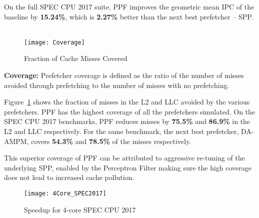 On the full SPEC CPU 2017 suite, PPF improves the geometric mean IPC of 
the baseline by \textbf{15.24\%}, which is \textbf{2.27\%} better 
than the next best prefetcher -- SPP.\\ \\
%
\begin{figure}[ht]
\texttt{[image: Coverage]}
\caption{Fraction of Cache Misses Covered}
\label{Fig:Coverage}
\end{figure}
%
\noindent \textbf{Coverage:}
Prefetcher coverage is defined as the ratio of the number of misses avoided
through prefetching to the number of misses with no prefetching.

Figure~\ref{Fig:Coverage} shows the fraction of misses in the L2 and LLC
avoided by the various prefetchers. PPF has the highest coverage of all the
prefetchers simulated. On the SPEC CPU 2017 benchmarks, PPF reduces misses by
\textbf{75.5\%} and \textbf{86.9\%} in the L2 and LLC respectively. For the
same benchmark, the next best prefetcher, DA-AMPM, covers \textbf{54.3\%} and
\textbf{78.5\%} of the misses respectively.

This superior coverage of PPF can be attributed to aggressive re-tuning of the
underlying SPP, enabled by the Perceptron Filter making sure the high coverage
does not lead to increased cache pollution.


\begin{figure}[ht]
\texttt{[image: 4Core\_SPEC2017]}
\caption{Speedup for 4-core SPEC CPU 2017}
\label{Fig:4Core_SPEC2017}
\end{figure}

